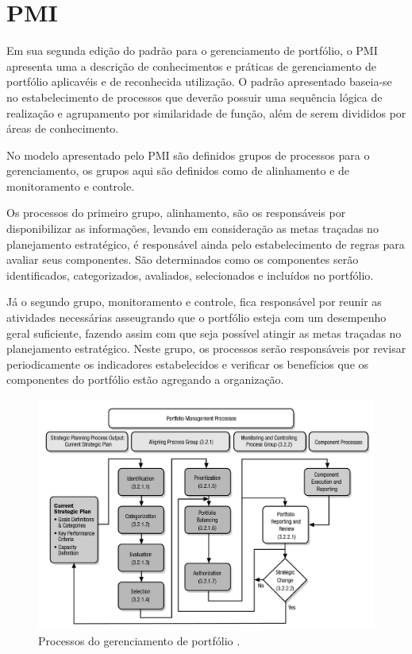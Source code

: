 \documentclass[12pt,a4paper,ruledheader,tocpage=prefix,floatnumber=continuous,pagestart=folhaderosto,font=times]{abnt}
\begin{document}
\section{PMI}
Em sua segunda edição do padrão para o gerenciamento de portfólio, o PMI apresenta uma a descrição de conhecimentos e práticas de gerenciamento de 
portfólio aplicavéis e de reconhecida utilização. O padrão apresentado baseia-se no estabelecimento de processos que deverão possuir uma sequência lógica 
de realização e agrupamento por similaridade de função, além de serem divididos por áreas de conhecimento. \cite{sppm}

No modelo apresentado pelo PMI são definidos grupos de processos para o gerenciamento, os grupos aqui são definidos como de alinhamento e de monitoramento
e controle. 

Os processos do primeiro grupo, alinhamento, são os responsáveis por disponibilizar as informações, levando em consideração as metas traçadas 
no planejamento estratégico, é responsável ainda pelo estabelecimento de regras para avaliar seus componentes. São determinados como os componentes serão 
identificados, categorizados, avaliados, selecionados e incluídos no portfólio.

Já o segundo grupo, monitoramento e controle, fica responsável por reunir as atividades necessárias asseugrando que o portfólio esteja com um desempenho 
geral suficiente, fazendo assim com que seja possível atingir as metas traçadas no planejamento estratégico. Neste grupo, os processos serão responsáveis
por revisar periodicamente os indicadores estabelecidos e verificar os benefícios que os componentes do portfólio estão agregando a organização.

\begin{figure}[H]
\centering
\includegraphics[width=.9\textwidth]{modelo_pmi.jpg}
\caption{Processos do gerenciamento de portfólio \cite{sppm}.}
\end{figure}
\end{document}
